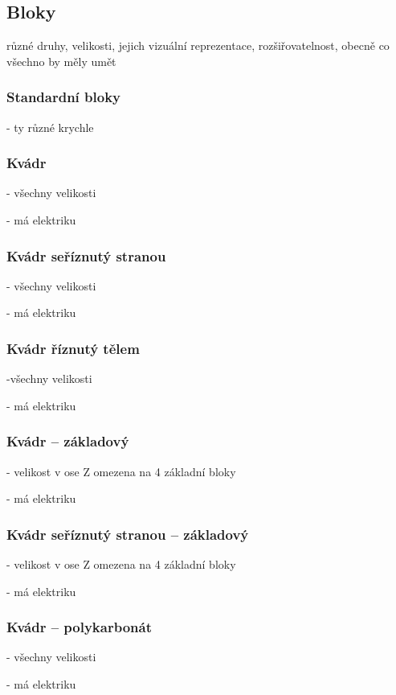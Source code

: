 
\subsection{Bloky}

různé druhy, velikosti, jejich vizuální reprezentace, rozšiřovatelnost, obecně co všechno by měly umět


\subsubsection{Standardní bloky}
- ty různé krychle

\subsubsection{Kvádr}
- všechny velikosti

- má elektriku

\subsubsection{Kvádr seříznutý stranou}
- všechny velikosti

- má elektriku

\subsubsection{Kvádr říznutý tělem}
-všechny velikosti

- má elektriku

\subsubsection{Kvádr -- základový}
- velikost v ose Z omezena na 4 základní bloky

- má elektriku

\subsubsection{Kvádr seříznutý stranou -- základový}
- velikost v ose Z omezena na 4 základní bloky

- má elektriku

\subsubsection{Kvádr -- polykarbonát}
- všechny velikosti

- má elektriku


